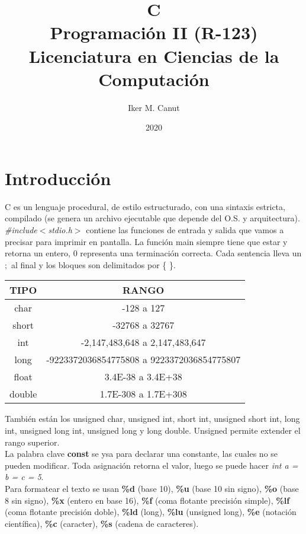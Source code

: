 \documentclass[11pt,a4paper]{article}
\author{Iker M. Canut}
\title{C\\Programaci\'on II (R-123)\\Licenciatura en Ciencias de la Computaci\'on}
\date{2020}
\begin{document}
\maketitle
\newpage
\section{Introducci\'on}
C es un lenguaje procedural, de estilo estructurado, con una sintaxis estricta, compilado (se genera un archivo ejecutable que depende del O.S. y arquitectura). \textit{\#include$<$stdio.h$>$} contiene las funciones de entrada y salida que vamos a precisar para imprimir en pantalla. La funci\'on main siempre tiene que estar y retorna un entero, 0 representa una terminaci\'on correcta. Cada sentencia lleva un $;$ al final y los bloques son delimitados por \{ \}.\\

\begin{table}[h]
\centering
\begin{tabular}{c|c}
\hline
TIPO & RANGO\\
\hline
char & -128 a 127\\
\hline
short & -32768 a 32767\\
\hline
int & -2,147,483,648 a 2,147,483,647\\
\hline
long & -9223372036854775808 a 9223372036854775807\\
\hline
float & 3.4E-38 a 3.4E+38\\
\hline
double & 1.7E-308 a 1.7E+308
\end{tabular}
\end{table}

Tambi\'en est\'an los unsigned char, unsigned int, short int, unsigned short int, long int, unsigned long int, unsigned long y long double. Unsigned permite extender el rango superior.\\

La palabra clave \textbf{const} se ysa para declarar una constante, las cuales no se pueden modificar. Toda asignaci\'on retorna el valor, luego se puede hacer \textit{int a = b = c = 5}.\\

Para formatear el texto se usan \textbf{\%d} (base 10), \textbf{\%u} (base 10 sin signo), \textbf{\%o} (base 8 sin signo), \textbf{\%x} (entero en base 16), \textbf{\%f} (coma flotante precisi\'on simple), \textbf{\%lf} (coma flotante precisi\'on doble), \textbf{\%ld} (long), \textbf{\%lu} (unsigned long), \textbf{\%e} (notaci\'on cient\'ifica), \textbf{\%c} (caracter), \textbf{\%s} (cadena de caracteres).\\
\end{document}
